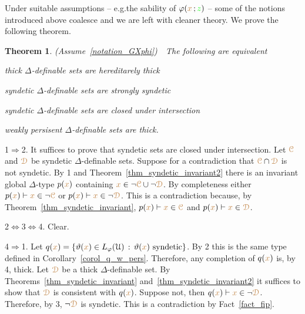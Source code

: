 \documentclass[10pt,openany]{amsproc}
\makeatletter
\newcommand{\mylabel}[1]{{\ssf{#1}}\hfill}
\renewenvironment{itemize}
  {\begin{list}{}{%
   \setlength{\parskip}{0mm}
   \setlength{\topsep}{.2\baselineskip}
   \setlength{\rightmargin}{0mm}
   \setlength{\listparindent}{0mm}
   \setlength{\itemindent}{0mm}
   \setlength{\labelwidth}{2ex}
   \setlength{\itemsep}{.1\baselineskip}
   \setlength{\parsep}{0mm}
   \setlength{\partopsep}{0mm}
   \setlength{\labelsep}{1ex}
   \setlength{\leftmargin}{\labelwidth+\labelsep}
   \let\makelabel\mylabel
   }}
   {\vspace*{-.3\baselineskip}\end{list}}
\def\proves{\vdash}
\def\IMP{\Rightarrow}
\def\IFF{\Leftrightarrow}
\def\D{\EuScript D}
\def\C{\EuScript C}
\def\U{\EuScript U}
\def\theta{\vartheta}
\def\phi{\varphi}
\def\ssf#1{\textsf{\small #1}}
\newcounter{thm}
\theoremstyle{mio}
\newtheorem{theorem}[thm]{Theorem}\tcolorboxenvironment{theorem}{mythm}
\providecommand{\proofNameStyle}{\bfseries}
\renewenvironment{proof}[1][\proofname]{\par
  \pushQED{\qed}%
  \normalfont%
  \trivlist
  \item[\hskip\labelsep
        \proofNameStyle
    #1\@addpunct{.}]\ignorespaces
}{%
  \popQED\endtrivlist\@endpefalse
}
\def\mr{\color{brown}}
\def\gr{\color{green}}
\def\mrC{{\mr\C}}
\def\mrD{{\mr\D}}
\makeatother
\begin{document}
Under suitable assumptions -- e.g.\@ the sability of $\phi({\mr x}\,;{\gr z})$ -- some of the notions introduced above coalesce and we are left with cleaner theory.
We prove the following theorem.

\begin{theorem}\label{thm_coalesce}
  (Assume~\ref{notation_GXphi})\ \  
  The following are equivalent
  \begin{itemize}
    \item[1.] thick $\Delta$-definable sets are hereditarely thick
    \item[2.] syndetic $\Delta$-definable sets are strongly syndetic
    \item[3.] syndetic $\Delta$-definable sets are closed under intersection
    \item[4.] weakly persisent $\Delta$-definable sets are thick.
  \end{itemize}
\end{theorem}

\begin{proof}
  \ssf1$\IMP$\ssf2.
  It suffices to prove that syndetic sets are closed under intersection.
  Let $\mrC$ and $\mrD$ be syndetic $\Delta$-definable sets.
  Suppose for a contradiction that $\mrC\cap\mrD$ is not syndetic.
  By \ssf1 and Theorem~\ref{thm_syndetic_invariant2} there is an invariant global $\Delta$-type $p({\mr x})$ containing ${\mr x}\in\neg\mrC\cup\neg\mrD$.
  By completeness either $p({\mr x})\proves{\mr x}\in\neg\mrC$ or $p({\mr x})\proves{\mr x}\in\neg\mrD$.
  This is a contradiction because, by Theorem~\ref{thm_syndetic_invariant}, $p({\mr x})\proves{\mr x}\in\mrC$ and $p({\mr x})\proves{\mr x}\in\mrD$.

  \ssf2$\IFF$\ssf3$\IFF$\ssf4. Clear.

  \ssf4$\IMP$\ssf1.
  Let $q({\mr x})=\{\theta({\mr x})\in L_\phi(\U)\,:\,\theta({\mr x})\textrm{ syndetic}\}$.
  By \ssf2 this is the same type defined in Corollary~\ref{corol_q_w_pers}.
  Therefore, any completion of $q({\mr x})$ is, by \ssf4, thick.
  Let $\mrD$ be a thick $\Delta$-definable set.
  By Theorems~\ref{thm_syndetic_invariant} and~\ref{thm_syndetic_invariant2} it suffices to show that $\mrD$ is consistent with $q({\mr x})$.
  Suppose not, then $q({\mr x})\proves {\mr x}\in\neg\mrD$.
  Therefore, by \ssf3, $\neg\mrD$ is syndetic.
  This is a contradiction by Fact~\ref{fact_fip}.
\end{proof}


\end{document}
